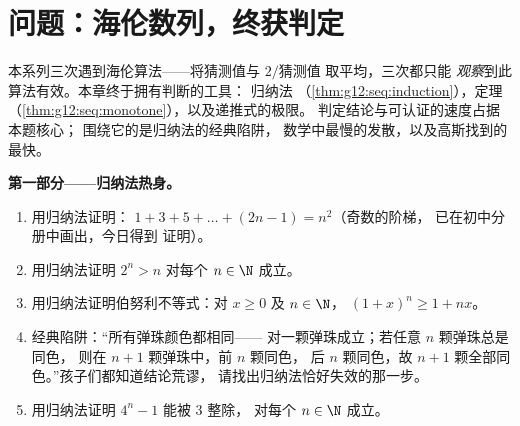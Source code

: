 \section{问题：海伦数列，终获判定}

\begin{problem}
\label{pb:g12:seq:1}
本系列三次遇到海伦算法——将猜测值与
$2/\text{猜测值}$ 取平均，三次都只能
\emph{观察}到此算法有效。本章终于拥有判断的工具：
归纳法
（\cref{thm:g12:seq:induction}），定理
（\cref{thm:g12:seq:monotone}），以及递推式的极限。
判定结论与可认证的速度占据本题核心；
围绕它的是归纳法的经典陷阱，
数学中最慢的发散，以及高斯找到的
最快。

\medskip
\noindent\textbf{第一部分——归纳法热身。}
\begin{enumerate}
  \item 用归纳法证明：
        $1 + 3 + 5 + \dots + (2n - 1) = n^2$（奇数的阶梯，
        已在初中分册中画出，今日得到
        证明）。
  \item 用归纳法证明 $2^n > n$ 对每个
        $n \in \N$ 成立。
  \item 用归纳法证明伯努利不等式：对
        $x \geq 0$ 及 $n \in \N$，
        $(1 + x)^n \geq 1 + nx$。
  \item 经典陷阱：“所有弹珠颜色都相同——
        对一颗弹珠成立；若任意 $n$ 颗弹珠总是同色，
        则在 $n + 1$ 颗弹珠中，前 $n$ 颗同色，
        后 $n$ 颗同色，故
        $n + 1$ 颗全部同色。”孩子们都知道结论荒谬，
        请找出归纳法恰好失效的那一步。
  \item 用归纳法证明 $4^n - 1$ 能被 $3$ 整除，
        对每个 $n \in \N$ 成立。
\end{enumerate}


\end{problem}
